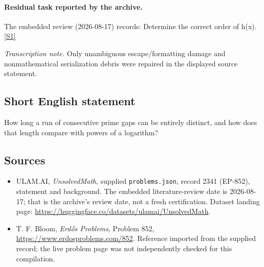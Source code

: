 \documentclass[11pt,a4paper]{article}
\newcommand{\sref}[2]{\hyperlink{source:#1:#2}{[S#2]}}
\begin{document}
\paragraph{Residual task reported by the archive.}

The embedded review (2026-08-17) records: Determine the correct order of h(x). \sref{2341}{1}

{\small\emph{Transcription note.} Only unambiguous escape/formatting damage and nonmathematical serialization debris were repaired in the displayed source statement.}

\subsection{Short English statement}

How long a run of consecutive prime gaps can be entirely distinct, and how does that length compare with powers of a logarithm?

\subsection{Sources}

{\small

\begin{itemize}

\item[\hypertarget{source:2341:1}{S1}] ULAM.AI, \emph{UnsolvedMath}, supplied \texttt{problems.json}, record 2341 (EP-852), statement and background. The embedded literature-review date is 2026-08-17; that is the archive’s review date, not a fresh certification. Dataset landing page: \url{https://huggingface.co/datasets/ulamai/UnsolvedMath}.

\item[\hypertarget{source:2341:2}{S2}] T. F. Bloom, \emph{Erdős Problems}, Problem 852, \url{https://www.erdosproblems.com/852}. Reference imported from the supplied record; the live problem page was not independently checked for this compilation.

\end{itemize}

}

\label{end:2341}
\end{document}
